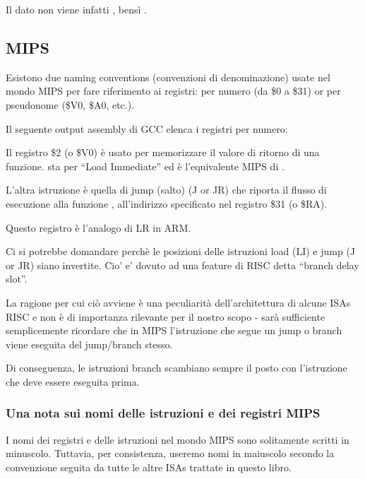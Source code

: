 Il dato non viene infatti , bensì .

\subsection{MIPS}

\label{MIPS_leaf_function_ex1}
Esistono due naming conventions (convenzioni di denominazione) usate nel mondo MIPS per fare riferimento ai registri: per numero (da \$0 a \$31) or per pseudonome (\$V0, \$A0, etc.).

Il seguente output assembly di GCC elenca i registri per numero:



\ITAph{}



Il registro \$2 (o \$V0) è usato per memorizzare il valore di ritorno di una funzione.
 sta per ``Load Immediate'' ed è l'equivalente MIPS di \MOV.

L'altra istruzione è quella di jump (salto) (J or JR) che riporta il flusso di esecuzione alla funzione ,  all'indirizzo specificato nel registro \$31 (o \$RA).

Questo registro è l'analogo di \ac{LR} in ARM.

Ci si potrebbe domandare perchè le posizioni delle istruzioni load (LI) e jump (J or JR) siano invertite. Cio' e' dovuto ad una feature di \ac{RISC} detta ``branch delay slot''.

La ragione per cui ciò avviene è una peculiarità dell'architettura di alcune \ac{ISA}s RISC e non è di importanza rilevante per il nostro scopo - sarà sufficiente semplicemente ricordare che in MIPS l'istruzione che segue un jump o branch viene eseguita  del jump/branch stesso.

Di conseguenza, le istruzioni branch scambiano sempre il posto con l'istruzione che deve essere eseguita prima.

\subsubsection{Una nota sui nomi delle istruzioni e dei registri MIPS}

I nomi dei registri e delle istruzioni nel mondo MIPS sono solitamente scritti in minuscolo. Tuttavia, per consistenza, useremo nomi in maiuscolo secondo la convenzione seguita da tutte le altre \ac{ISA}s trattate in questo libro.

